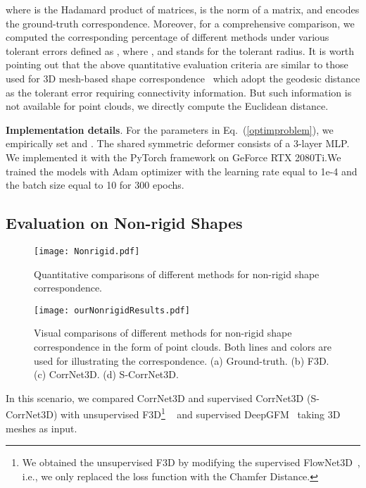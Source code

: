 \documentclass[final]{cvpr}
\begin{document}
where  is the Hadamard product of matrices,  is the  norm of a matrix, and  encodes the ground-truth correspondence.
Moreover, for a comprehensive comparison, we computed the corresponding percentage of different methods under various  tolerant errors defined as , where , and  stands for the tolerant radius.
It is worth pointing out that the above quantitative evaluation criteria are similar to those used for 3D mesh-based shape correspondence~\cite{ovsjanikov2012functional,litany2017deep} which adopt the geodesic distance as the tolerant error requiring connectivity information. But such information is not available for point clouds, we directly compute the Euclidean distance. 



\textbf{Implementation details}. For the parameters in  Eq.~(\ref{optimproblem}), we empirically 
set  and . The shared symmetric deformer consists of a 3-layer MLP. We implemented it with 
the PyTorch framework \cite{paszke2017automatic} on GeForce RTX 2080Ti.We trained the models with Adam \cite{kingma2014adam} optimizer with the learning rate equal to 1e-4 and the batch size equal to 10 for 300 epochs.  







\subsection{Evaluation on Non-rigid Shapes}
\begin{figure}[t]
   \centering
   \texttt{[image: Nonrigid.pdf]}
   \caption{Quantitative comparisons of different methods for non-rigid shape correspondence.}
     \label{Nonrigid}
 \end{figure}
 \begin{figure}[t]
  \centering
  \texttt{[image: ourNonrigidResults.pdf]}
  \caption{ Visual comparisons of different methods for non-rigid shape correspondence in the form of point clouds. Both lines and colors are used for illustrating the correspondence.  (a) Ground-truth. (b) F3D. (c) CorrNet3D. (d) S-CorrNet3D.}
  \label{ourNonrigidResults}
 \end{figure} 

In this scenario, we compared CorrNet3D and supervised CorrNet3D (S-CorrNet3D) with unsupervised F3D\footnote{We obtained the unsupervised F3D by modifying the supervised FlowNet3D~\cite{liu2019flownet3d}, i.e., we only replaced the loss function with the Chamfer Distance. } ~\cite{liu2019flownet3d} and supervised DeepGFM~\cite{donati2020deep} taking 3D meshes as input.  
\end{document}
